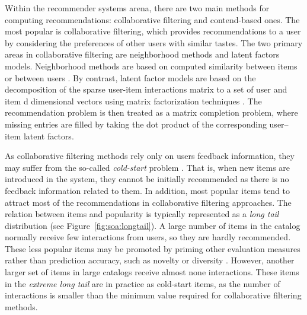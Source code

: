 Within the recommender systems arena, there are two main methods for computing recommendations: collaborative filtering and contend-based ones.
The most popular is collaborative filtering, which provides recommendations to a user by considering the preferences of other users with similar tastes. 
The two primary areas in collaborative filtering are neighborhood methods and latent factors models. Neighborhood methods are based on computed similarity between items or between users \citep{Sarwar2001}. By contrast, latent factor models are based on the decomposition of the sparse user-item interactions matrix to a set of user and item d dimensional vectors using matrix factorization techniques \citep{Koren2009}. The recommendation problem is then treated as a matrix completion problem, where missing entries are filled by taking the dot product of the corresponding user–item latent factors. %

As collaborative filtering methods rely only on users feedback information, they may suffer from the so-called \textit{cold-start} problem \citep{Saveski2014}. That is, when new items are introduced in the system, they cannot be initially recommended as there is no feedback information related to them.
In addition, most popular items tend to attract most of the recommendations in collaborative filtering approaches. The relation between items and popularity is typically represented as a \textit{long tail} distribution \citep{anderson2006long} (see Figure~\ref{fig:soa:longtail}). A large number of items in the catalog normally receive few interactions from users, so they are hardly recommended. %
These less popular items may be promoted by priming other evaluation measures rather than prediction accuracy, such as novelty or diversity \citep{abdollahpouri2017controlling}.
However, another larger set of items in large catalogs receive almost none interactions. These items in the \textit{extreme long tail} are in practice as cold-start items, as the number of interactions is smaller than the minimum value required for collaborative filtering methods.

